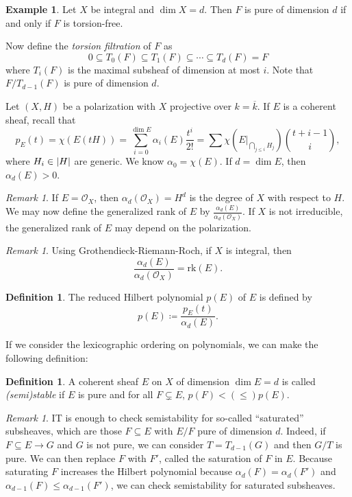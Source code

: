 \documentclass[leqno, openany]{memoir}
\theoremstyle{definition}
\newtheorem{defn}[thm]{Definition}
\newtheorem{exm}[thm]{Example}
\theoremstyle{remark}
\newtheorem{rmk}[thm]{Remark}
\theoremstyle{plain}
\theoremstyle{definition}
\theoremstyle{remark}
\newcommand{\mc}[1]{\mathcal{#1}}
\newcommand{\mr}[1]{\mathrm{#1}}
\newcommand{\ol}[1]{\overline{#1}}
\begin{document}
\begin{exm}
    Let $X$ be integral and $\dim X = d$. Then $F$ is pure of dimension $d$ if and only if $F$ is torsion-free.
\end{exm}

Now define the \textit{torsion filtration} of $F$ as
\[ 0 \subseteq T_0(F) \subseteq T_1(F) \subseteq \cdots \subseteq T_d(F) = F \]
where $T_i(F)$ is the maximal subsheaf of dimension at most $i$. Note that $F/T_{d-1}(F)$ is pure of dimension $d$.

Let $(X, H)$ be a polarization with $X$ projective over $k = \ol{k}$. If $E$ is a coherent sheaf, recall that 
\[ p_E(t) = \chi(E(tH)) = \sum_{i=0}^{\dim E} \alpha_i(E) \frac{t^i}{2!} = \sum \chi(E|_{\bigcap_{j \leq i} H_j}) \binom{t+i-1}{i}, \]
where $H_i \in \abs{H}$ are generic. We know $\alpha_0 = \chi(E)$. If $d = \dim E$, then $\alpha_d(E) > 0$. 

\begin{rmk}
    If $E = \mc{O}_X$, then $\alpha_d(\mc{O}_X) = H^d$ is the degree of $X$ with respect to $H$. We may now define the generalized rank of $E$ by $\frac{\alpha_d(E)}{\alpha_d(\mc{O}_X)}$. If $X$ is not irreducible, the generalized rank of $E$ may depend on the polarization.
\end{rmk}

\begin{rmk}
    Using Grothendieck-Riemann-Roch, if $X$ is integral, then
    \[ \frac{\alpha_d(E)}{\alpha_d(\mc{O}_X)} = \mr{rk}(E). \]
\end{rmk}

\begin{defn}
    The reduced Hilbert polynomial $p(E)$ of $E$ is defined by
    \[ p(E) \coloneqq \frac{p_E(t)}{\alpha_d(E)}. \]
\end{defn}
If we consider the lexicographic ordering on polynomials, we can make the following definition:
\begin{defn}
    A coherent sheaf $E$ on $X$ of dimension $\dim E = d$ is called \textit{(semi)stable} if $E$ is pure and for all $F \subsetneq E$, $p(F) < (\leq) p(E)$.
\end{defn}

\begin{rmk}
    IT is enough to check semistability for so-called ``saturated'' subsheaves, which are those $F \subseteq E$ with $E/F$ pure of dimension $d$. Indeed, if $F \subseteq E \to G$ and $G$ is not pure, we can consider $T = T_{d-1}(G)$ and then $G/T$ is pure. We can then replace $F$ with $F'$, called the saturation of $F$ in $E$. Because saturating $F$ increases the Hilbert polynomial because $\alpha_d(F) = \alpha_d(F')$ and $\alpha_{d-1}(F) \leq \alpha_{d-1}(F')$, we can check semistability for saturated subsheaves.
\end{rmk}
\end{document}
